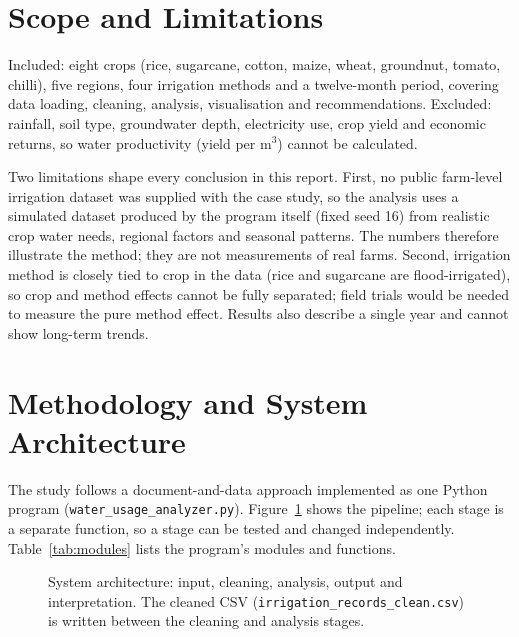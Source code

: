 \documentclass[11pt,a4paper]{article}
\begin{document}
\section{Scope and Limitations}
Included: eight crops (rice, sugarcane, cotton, maize, wheat, groundnut, tomato,
chilli), five regions, four irrigation methods and a twelve-month period, covering data
loading, cleaning, analysis, visualisation and recommendations. Excluded: rainfall,
soil type, groundwater depth, electricity use, crop yield and economic returns, so
water productivity (yield per m$^3$) cannot be calculated.

Two limitations shape every conclusion in this report. First, no public farm-level
irrigation dataset was supplied with the case study, so the analysis uses a simulated
dataset produced by the program itself (fixed seed 16) from realistic crop water needs,
regional factors and seasonal patterns. The numbers therefore illustrate the method;
they are not measurements of real farms. Second, irrigation method is closely tied to
crop in the data (rice and sugarcane are flood-irrigated), so crop and method effects
cannot be fully separated; field trials would be needed to measure the pure method
effect. Results also describe a single year and cannot show long-term trends.

\section{Methodology and System Architecture}
The study follows a document-and-data approach implemented as one Python program
(\texttt{water\_\allowbreak usage\_\allowbreak analyzer.py}).
Figure~\ref{fig:arch} shows the pipeline; each
stage is a separate function, so a stage can be tested and changed independently.
Table~\ref{tab:modules} lists the program's modules and functions.

\begin{figure}[h]
\centering
{}
\caption{System architecture: input, cleaning, analysis, output and interpretation.
  The cleaned CSV (\texttt{irrigation\_records\_clean.csv}) is written between the
  cleaning and analysis stages.}
\label{fig:arch}
\end{figure}
\end{document}
